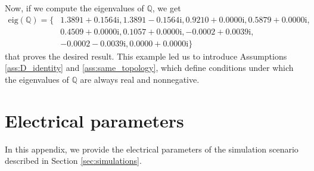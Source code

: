\documentclass[a4paper]{article}
\theoremstyle{plain}
\newcommand{\mbf}[1]{\mathbf{#1}}                  \newcommand{\mbfgk}[1]{\boldsymbol{#1}}                  \newcommand{\One}{\textbf{1}}
\begin{document}
Now, if we compute the eigenvalues of $\mathbb{Q}$, we get 
\[
\begin{aligned}
\text{eig}(\mathbb{Q}) =\{&1.3891 + 0.1564\mathrm{i},1.3891 - 0.1564\mathrm{i},0.9210 + 0.0000\mathrm{i},0.5879 + 0.0000\mathrm{i},\\
&0.4509 + 0.0000\mathrm{i}, 0.1057 + 0.0000\mathrm{i}, \mbf{-0.0002 + 0.0039\mathrm{i}},\\
&\mathbf{-0.0002 - 0.0039\mathrm{i}}, 0.0000 + 0.0000\mathrm{i}\}
\end{aligned}\]
that proves the desired result. This example led us to introduce Assumptions \ref{ass:D_identity} and \ref{ass:same_topology}, which define conditions under which the eigenvalues of $\mathbb{Q}$ are always real and nonnegative. 	\newpage
     \section{Electrical parameters }
 \label{sec:AppElectrPar}
 In this appendix, we provide the electrical parameters of the simulation scenario described in Section \ref{sec:simulations}.
 
\end{document}
